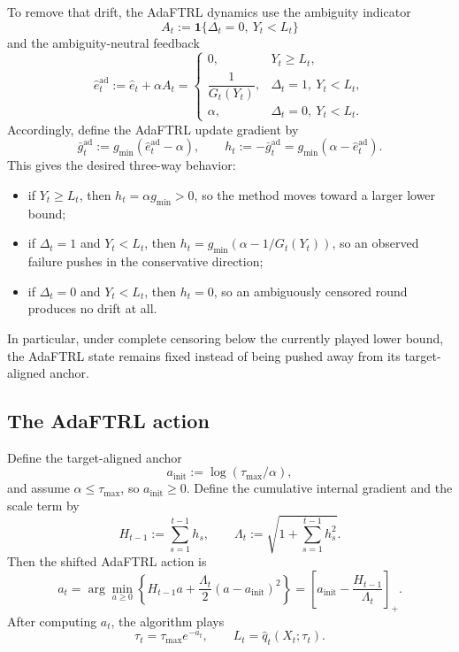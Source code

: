 \documentclass[11pt]{article}
\newcommand{\1}{\mathbf{1}}
\begin{document}
To remove that drift, the AdaFTRL dynamics use the ambiguity indicator
\[
A_t:=\1\{\Delta_t=0,\ Y_t<L_t\}
\]
and the ambiguity-neutral feedback
\[
\hat e_t^{\mathrm{ad}}
:=
\hat e_t+\alpha A_t
=
\begin{cases}
0, & Y_t\ge L_t,\\[1ex]
\dfrac{1}{G_t(Y_t)}, & \Delta_t=1,\ Y_t<L_t,\\[2ex]
\alpha, & \Delta_t=0,\ Y_t<L_t.
\end{cases}
\]
Accordingly, define the AdaFTRL update gradient by
\[
\bar g_t^{\mathrm{ad}}:=g_{\min}(\hat e_t^{\mathrm{ad}}-\alpha),
\qquad
h_t:=-\bar g_t^{\mathrm{ad}}=g_{\min}(\alpha-\hat e_t^{\mathrm{ad}}).
\]
This gives the desired three-way behavior:
\begin{itemize}[leftmargin=*,itemsep=2pt]
  \item if \(Y_t\ge L_t\), then \(h_t=\alpha g_{\min}>0\), so the method moves toward a larger lower bound;
  \item if \(\Delta_t=1\) and \(Y_t<L_t\), then \(h_t=g_{\min}(\alpha-1/G_t(Y_t))\), so an observed failure pushes in the conservative direction;
  \item if \(\Delta_t=0\) and \(Y_t<L_t\), then \(h_t=0\), so an ambiguously censored round produces no drift at all.
\end{itemize}
In particular, under complete censoring below the currently played lower bound, the AdaFTRL state remains fixed instead of being pushed away from its target-aligned anchor.

\subsection{The AdaFTRL action}

Define the target-aligned anchor
\[
a_{\mathrm{init}}:=\log(\tau_{\max}/\alpha),
\]
and assume \(\alpha\le \tau_{\max}\), so \(a_{\mathrm{init}}\ge 0\). Define the cumulative internal gradient and the scale term by
\[
H_{t-1}:=\sum_{s=1}^{t-1} h_s,
\qquad
\Lambda_t:=\sqrt{1+\sum_{s=1}^{t-1} h_s^2}.
\]
Then the shifted AdaFTRL action is
\[
a_t
=
\arg\min_{a\ge 0}
\left\{
H_{t-1}a+\frac{\Lambda_t}{2}(a-a_{\mathrm{init}})^2
\right\}
=
\left[a_{\mathrm{init}}-\frac{H_{t-1}}{\Lambda_t}\right]_+.
\]
After computing \(a_t\), the algorithm plays
\[
\tau_t=\tau_{\max}e^{-a_t},
\qquad
L_t=\hat q_t(X_t;\tau_t).
\]
\end{document}
